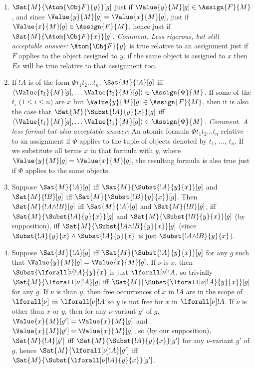 \documentclass[../../../../include/open-logic-section]{subfiles}
\begin{document}
\begin{ans}
\begin{enumerate}
	\item $\Sat{M}{\Atom{\Obj F}{y}}[g]$ just if $\Value{y}{M}[g] \in \Assign{F}{M}$, and since 
	$\Value{y}{M}[g] = \Value{x}{M}[g]$, just if $\Value{x}{M}[g] \in \Assign{F}{M}$, hence 
	just if $\Sat{M}{\Atom{\Obj F}{x}}[g]$. \emph{Comment. Less rigorous, but still acceptable
	answer:} $\Atom{\Obj F}{y}$ is true relative to an assignment just if $F$ applies to the object assigned to $y$; if the same object is assigned to $x$ then $Fx$ will be true relative to that assignment too.
	\item If $!A$ is of the form $\Phi t_1t_2\ldots t_n$, $\Sat{M}{!A}[g]$ iff $\langle \Value{t_1}{M}[g], \ldots \Value{t_1}{M}[g] \rangle \in \Assign{\Phi}{M}$. If some of the $t_i$ ($1\leq i\leq n$) are $x$ but $\Value{y}{M}[g] \in \Assign{F}{M}$, then it is also the case that $\Sat{M}{\Subst{!A}{y}{x}}[g]$ iff $\langle \Value{t_1}{M}[g], \ldots \Value{t_1}{M}[g] \rangle \in \Assign{\Phi}{M}$. \emph{Comment. A less formal but also acceptable answer}: An atomic formula $\Phi t_1t_2\ldots t_n$ relative to an assignment if $\Phi$ applies to the tuple of objects denoted by $t_1$, $\ldots$, $t_n$. If we substitute all terms $x$ in that formula with $y$, where $\Value{y}{M}[g] = \Value{x}{M}[g]$, the resulting formula is also true just if $\Phi$ applies to the same objects.
	\item Suppose $\Sat{M}{!A}[g]$ iff $\Sat{M}{\Subst{!A}{y}{x}}[g]$ and $\Sat{M}{!B}[g]$ iff $\Sat{M}{\Subst{!B}{y}{x}}[g]$. Then $\Sat{M}{!A \land !B}[g]$ iff $\Sat{M}{!A}[g]$ and $\Sat{M}{!B}[g]$, iff $\Sat{M}{\Subst{!A}{y}{x}}[g]$ and $\Sat{M}{\Subst{!B}{y}{x}}[g]$ (by supposition), iff  $\Sat{M}{\Subst{!A \land !B}{y}{x}}[g]$ (since $\Subst{!A}{y}{x} \land \Subst{!A}{y}{x}$ is just $\Subst{!A \land !B}{y}{x}$). 
	\item Suppose $\Sat{M}{!A}[g]$ iff $\Sat{M}{\Subst{!A}{y}{x}}[g]$ for any $g$ such that $\Value{y}{M}[g] = \Value{x}{M}[g]$. If $\nu$ is $x$, then $\Subst{\lforall[\nu]!A}{y}{x}$ is just $\lforall[\nu]!A$, so trivially $\Sat{M}{\lforall[\nu]!A}[g]$ iff $\Sat{M}{\Subst{\lforall[\nu]!A}{y}{x}}[g]$ for any $g$. If $\nu$ is than $y$, then free occurrences of $x$ in $!A$ are in the scope of $\lforall[\nu]$ in $\lforall[\nu]!A$ so $y$ is not free for $x$ in $\lforall[\nu]!A$. If $\nu$ is other than $x$ or $y$, then for any $\nu$-variant $g'$ of $g$, $\Value{x}{M}[g'] = \Value{x}{M}[g]$ and $\Value{x}{M}[y'] = \Value{x}{M}[g]$, so (by our supposition),  $\Sat{M}{!A}[g']$ iff $\Sat{M}{\Subst{!A}{y}{x}}[g']$ for any $\nu$-variant $g'$ of $g$, hence $\Sat{M}{\lforall[\nu]!A}[g']$ iff $\Sat{M}{\Subst{\lforall[\nu]!A}{y}{x}}[g']$.

\end{enumerate}
\end{ans}
\end{document}
